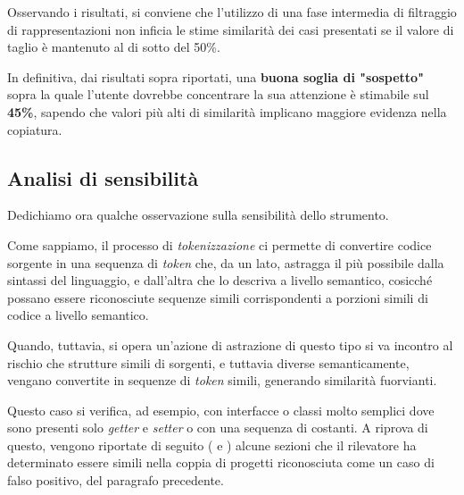 Osservando i risultati, si conviene che l'utilizzo di una fase intermedia di filtraggio di rappresentazioni non inficia le stime similarità dei casi presentati se il valore di taglio è mantenuto al di sotto del 50\%.

\vspace*{0.3cm}

In definitiva, dai risultati sopra riportati, una \textbf{buona soglia di "sospetto"} sopra la quale l'utente dovrebbe concentrare la sua attenzione è stimabile sul \textbf{45\%}, sapendo che valori più alti di similarità implicano maggiore evidenza nella copiatura.

\subsection{Analisi di sensibilità}
Dedichiamo ora qualche osservazione sulla sensibilità dello strumento.

Come sappiamo, il processo di \textit{tokenizzazione} ci permette di convertire codice sorgente in una sequenza di \textit{token} che, da un lato, astragga il più possibile dalla sintassi del linguaggio, e dall'altra che lo descriva a livello semantico, cosicché possano essere riconosciute sequenze simili corrispondenti a porzioni simili di codice a livello semantico.

Quando, tuttavia, si opera un'azione di astrazione di questo tipo si va incontro al rischio che strutture simili di sorgenti, e tuttavia diverse semanticamente, vengano convertite in sequenze di \textit{token} simili, generando similarità fuorvianti.

Questo caso si verifica, ad esempio, con interfacce o classi molto semplici dove sono presenti solo \textit{getter} e \textit{setter} o con una sequenza di costanti.
%
A riprova di questo, vengono riportate di seguito ( e ) alcune sezioni che il rilevatore ha determinato essere simili nella coppia di progetti riconosciuta come un caso di falso positivo, del paragrafo precedente. 



\newpage




